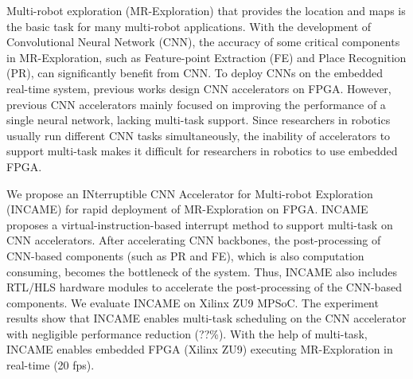 Multi-robot exploration (MR-Exploration) that provides the location and maps is the basic task for many multi-robot applications. 
With the development of Convolutional Neural Network (CNN), the accuracy of some critical components in MR-Exploration, such as Feature-point Extraction (FE) and Place Recognition (PR), can significantly benefit from CNN. 
To deploy CNNs on the embedded real-time system, previous works design CNN accelerators on FPGA. 
However, previous CNN accelerators mainly focused on improving the performance of a single neural network, lacking multi-task support.
Since researchers in robotics usually run different CNN tasks simultaneously, the inability of accelerators to support multi-task makes it difficult for researchers in robotics to use embedded FPGA.

We propose an INterruptible CNN Accelerator for Multi-robot Exploration (INCAME) for rapid deployment of MR-Exploration on FPGA.
INCAME proposes a virtual-instruction-based interrupt method to support multi-task on CNN accelerators.
After accelerating  CNN backbones, the post-processing of  CNN-based components (such as PR and FE), which is also computation consuming, becomes the bottleneck of the system.
Thus, INCAME also includes RTL/HLS hardware modules to accelerate the post-processing of the CNN-based components.
We evaluate INCAME on Xilinx ZU9 MPSoC. The experiment results show that INCAME enables multi-task scheduling on the CNN accelerator with negligible performance reduction (??\%). With the help of multi-task, INCAME enables embedded FPGA (Xilinx ZU9) executing MR-Exploration in real-time (20 fps).

